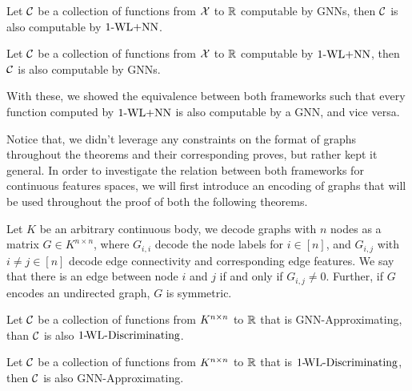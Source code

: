 \begin{theorem}\label{theorem:1wl_in_gnn}
    Let $\mathcal{C}$ be a collection of functions from $\mathcal{X}$ to $\mathbb{R}$ computable by GNNs, then $\mathcal{C}$ is also computable by $\text{1-WL+NN}$.
\end{theorem}

\begin{theorem}\label{theorem:gnn_in_1wl}
    Let $\mathcal{C}$ be a collection of functions from $\mathcal{X}$ to $\mathbb{R}$ computable by $\text{1-WL+NN}$, then $\mathcal{C}$ is also computable by GNNs.
\end{theorem}
With these, we showed the equivalence between both frameworks such that every function computed by $\text{1-WL+NN}$ is also computable by a GNN, and vice versa.

Notice that, we didn't leverage any constraints on the format of graphs throughout the theorems and their corresponding proves, but rather kept it general. In order to investigate the relation between both frameworks for continuous features spaces, we will first introduce an encoding of graphs that will be used throughout the proof of both the following theorems.

\begin{definition}
    Let $K$ be an arbitrary continuous body, we decode graphs with $n$ nodes as a matrix $G \in K^{n \times n}$, where $G_{i,i}$ decode the node labels for $i \in [n]$, and $G_{i,j}$ with $i \neq j \in [n]$ decode edge connectivity and corresponding edge features. We say that there is an edge between node $i$ and $j$ if and only if $G_{i,j} \neq 0$. Further, if $G$ encodes an undirected graph, $G$ is symmetric.
\end{definition}


\begin{theorem}\label{theorem:gnn_approximating_in_1wl}
    Let $\mathcal{C}$ be a collection of functions from $K^{n \times n}$ to $\mathbb{R}$ that is GNN-Approximating, than $\mathcal{C}$ is also $\text{1-\!WL-Discriminating}$.
\end{theorem}

\begin{theorem}\label{theorem:1wl_in_gnn_approximating}
    Let $\mathcal{C}$ be a collection of functions from $K^{n \times n}$ to $\mathbb{R}$ that is $\text{1-\!WL-Discriminating}$, then $\mathcal{C}$ is also GNN-Approximating.
\end{theorem}

